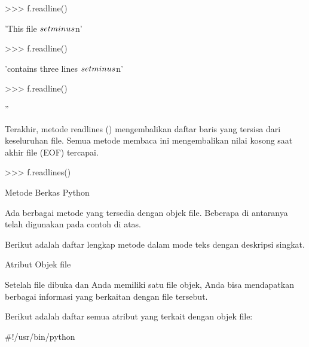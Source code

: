 \vspace{12pt}
>>> f.readline() \par
'This file $  \\setminus  $n' \par
\vspace{12pt}
>>> f.readline() \par
'contains three lines $  \\setminus  $n' \par
\vspace{12pt}
>>> f.readline() \par
'' \par
\vspace{12pt}
Terakhir, metode readlines () mengembalikan daftar baris yang tersisa dari keseluruhan file. Semua metode membaca ini mengembalikan nilai kosong saat akhir file (EOF) tercapai. \par
\vspace{12pt}
>>> f.readlines() \par
['This is my first file $  \\setminus  $n', 'This file $  \\setminus  $n', 'contains three lines $  \\setminus  $n'] \par
\vspace{12pt}
\vspace{12pt}
Metode Berkas Python \par
\vspace{12pt}
Ada berbagai metode yang tersedia dengan objek file. Beberapa di antaranya telah digunakan pada contoh di atas. \par
\vspace{12pt}
Berikut adalah daftar lengkap metode dalam mode teks dengan deskripsi singkat. \par
\vspace{12pt}
Atribut Objek file \par
\vspace{12pt}
Setelah file dibuka dan Anda memiliki satu file objek, Anda bisa mendapatkan berbagai informasi yang berkaitan dengan file tersebut. \par
\vspace{12pt}
Berikut adalah daftar semua atribut yang terkait dengan objek file: \par
\vspace{12pt}
\vspace{12pt}
\vspace{12pt}
 $  \#  $!/usr/bin/python \par
